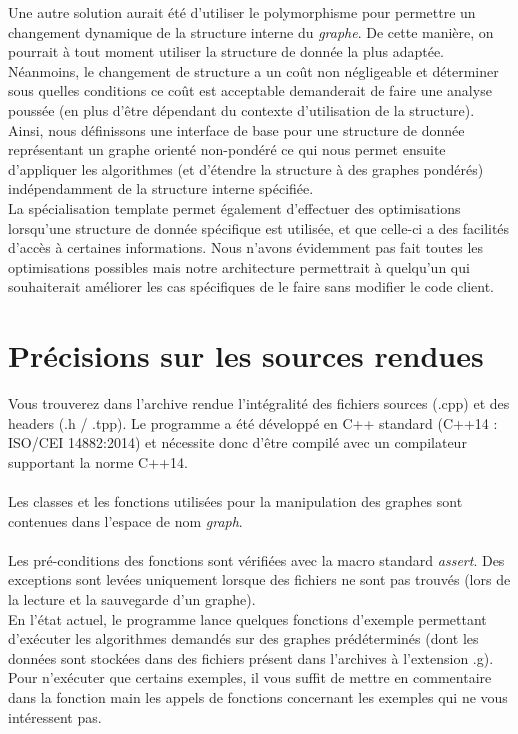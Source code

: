 \documentclass[12pt]{article}
\begin{document}
Une autre solution aurait été d'utiliser le polymorphisme pour permettre un changement dynamique de la structure interne du {\it graphe}. De cette manière, on pourrait à tout moment utiliser la structure de donnée la plus adaptée. Néanmoins, le changement de structure a un coût non négligeable et déterminer sous quelles conditions ce coût est acceptable demanderait de faire une analyse poussée (en plus d'être dépendant du contexte d'utilisation de la structure). \\ 

Ainsi, nous définissons une interface de base pour une structure de donnée représentant un graphe orienté non-pondéré ce qui nous permet ensuite d'appliquer les algorithmes (et d'étendre la structure à des graphes pondérés) indépendamment de la structure interne spécifiée. \\ 

La spécialisation template permet également d'effectuer des optimisations lorsqu'une structure de donnée spécifique est utilisée, et que celle-ci a des facilités d'accès à certaines informations. Nous n'avons évidemment pas fait toutes les optimisations possibles mais notre architecture permettrait à quelqu'un qui souhaiterait améliorer les cas spécifiques de le faire sans modifier le code client. \\ 

\section{Précisions sur les sources rendues }
Vous trouverez dans l'archive rendue l'intégralité des fichiers sources (.cpp) et des headers (.h / .tpp). Le programme a été développé en C++ standard (C++14 : ISO/CEI 14882:2014) et nécessite donc d'être compilé avec un compilateur supportant la norme C++14.\\ \\
Les classes et les fonctions utilisées pour la manipulation des graphes sont contenues dans l'espace de nom {\it graph}. \\ \\
Les pré-conditions des fonctions sont vérifiées avec la macro standard {\it assert}. Des exceptions sont levées uniquement lorsque des fichiers ne sont pas trouvés (lors de la lecture et la sauvegarde d'un graphe). \\ 

 En l'état actuel, le programme lance quelques fonctions d'exemple permettant d'exécuter les algorithmes demandés sur des graphes prédéterminés (dont les données sont stockées dans des fichiers présent dans l'archives à l'extension .g). Pour n'exécuter que certains exemples, il vous suffit de mettre en commentaire dans la fonction main les appels de fonctions concernant les exemples qui ne vous intéressent pas. \\ 
 
\end{document}

